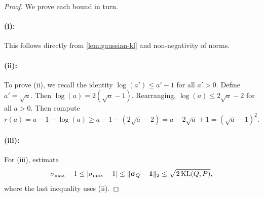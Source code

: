 \documentclass[twoside]{article}
\renewcommand{\ss}[1]{_{\text{#1}}}
\newcommand{\vsigma}{\bm{\upsigma}}
\newcommand{\vone}{\mathbf{1}}
\renewcommand{\P}{\mathbb{P}}
\newcommand{\Q}{\mathbb{Q}}
\renewcommand{\Q}{\ensuremath{Q}}
\renewcommand{\P}{\ensuremath{P}}
\newcommand{\KL}{\operatorname{KL}}
\renewcommand{\ss}[1]{_{\text{#1}}}        %
\DeclarePairedDelimiter\norm{\|}{\|}             %
\DeclarePairedDelimiter\abs{|}{|}                %
\theoremstyle{theoremstyle}
\begin{document}
\begin{proof}
We prove each bound in turn.
\paragraph{(i):}
    This follows directly from \cref{lem:gaussian-kl} and non-negativity of norms.
    
\paragraph{(ii):}
    To prove (ii), we recall the identity $\log (a') \leq a'-1$ for all $a'>0.$ Define $a'=\sqrt{a}$. Then $\log(a) = 2(\sqrt{a} - 1)$. %
Rearranging, $\log(a) \le 2 \sqrt{a} - 2$ for all $a > 0$. Then compute
    \begin{equation}
        r(a) = a - 1 - \log(a)
        \ge a - 1 - (2 \sqrt{a} - 2)
        =  a - 2 \sqrt{a} + 1
        = (\sqrt{a} - 1)^2.
    \end{equation}
    
\paragraph{(iii):}    
    For (iii), estimate
    \begin{equation}
        \sigma\ss{max} - 1
        \le \abs{\sigma\ss{max} - 1}
        \le \norm{\vsigma_\Q - \vone}_2
        \le \sqrt{2 \KL(\Q, \P)},
    \end{equation}
where the last inequality uses (ii).


\end{proof}
\end{document}
